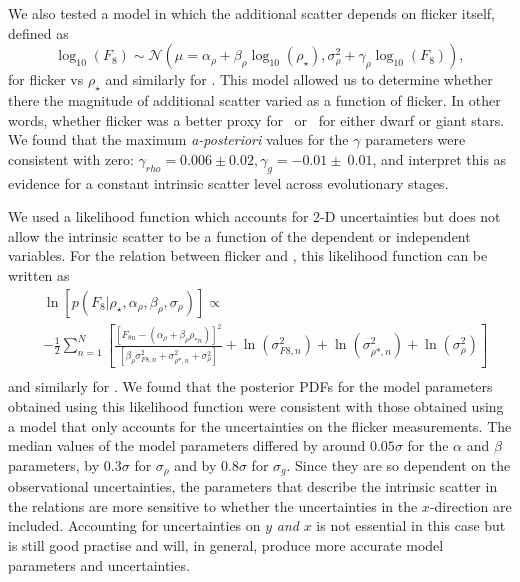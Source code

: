We also tested a model in which the additional scatter depends on flicker
itself, defined as
\begin{equation}
	\log_{10}(F_8) \sim \mathcal{N} \left(\mu = \alpha_\rho +
    \beta_\rho \log_{10}(\rho_\star), \sigma_{\rho}^2 + \gamma_\rho
    \log_{10}(F_8)
    \right),
\end{equation}
\label{eq:rho2}
for flicker vs $\rho_\star$ and similarly for \logg.
This model allowed us to determine whether there the magnitude of additional
scatter varied as a function of flicker.
In other words, whether flicker was a better proxy for \logg\ or \rhostar\ for
either dwarf or giant stars.
We found that the maximum {\it a-posteriori} values for the $\gamma$
parameters were consistent with zero: $\gamma_{rho} = 0.006 \pm 0.02, \gamma_g
= -0.01 \pm\ 0.01$, and interpret this as evidence for a constant intrinsic
scatter level across evolutionary stages.

We used a likelihood function which accounts for 2-D uncertainties but does
not allow the intrinsic scatter to be a function of the dependent or
independent variables.
For the relation between flicker and \rhostar, this likelihood function can be
written as
\begin{eqnarray}
	& \ln\left[p(F_8|\rho_\star, \alpha_\rho, \beta_\rho, \sigma_{\rho})\right]
        \propto  \\ \nonumber
    & -\frac{1}{2}\sum_{n=1}^N \left[\frac{[F_{8n}-(\alpha_\rho
    + \beta_\rho \rho_{*n})]^2}
	{\left[\beta_\rho \sigma_{F8, n}^2 + \sigma_{\rho *, n}^2 +
    \sigma_{\rho}^2\right]} + \ln(\sigma_{F8, n}^2) + \ln(\sigma_{\rho*, n}^2)
    + \ln(\sigma_\rho^2) \right]
	\\ \nonumber
\end{eqnarray}
\label{eq:likelihood}
and similarly for \logg.
We found that the posterior PDFs for the model parameters obtained using this
likelihood function were consistent with those obtained using a model that
only accounts for the uncertainties on the flicker measurements.
The median values of the model parameters differed by around $0.05
\sigma$ for the $\alpha$ and $\beta$ parameters, by $0.3 \sigma$ for
$\sigma_\rho$ and by $0.8 \sigma$ for $\sigma_g$.
Since they are so dependent on the observational uncertainties, the parameters
that describe the intrinsic scatter in the relations are more sensitive to
whether the uncertainties in the $x$-direction are included.
Accounting for uncertainties on $y$ {\it and} $x$ is not essential in this
case but is still good practise and will, in general, produce more accurate
model parameters and uncertainties.

